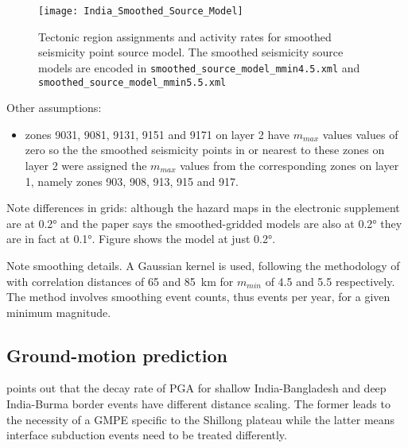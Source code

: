\documentclass{article}
\begin{document}
\begin{figure}[!htb]
\begin{adjustbox}{center}
\texttt{[image: India\_Smoothed\_Source\_Model]}
\end{adjustbox}
\caption[Smoothed seismicity point source model]{Tectonic region assignments and activity rates for smoothed seismicity point source model. The smoothed seismicity source models are encoded in \texttt{smoothed\_source\_model\_mmin4.5.xml} and \texttt{smoothed\_source\_model\_mmin5.5.xml}}
\label{fig:SmoothedSourceModel}
\end{figure}

Other assumptions:
\begin{itemize}
\item zones 9031, 9081, 9131, 9151 and 9171 on layer 2 have $m_{max}$ values values of zero so the the smoothed seismicity points in or nearest to these zones on layer 2 were assigned the $m_{max}$ values from the corresponding zones on layer 1, namely zones 903, 908, 913, 915 and 917.
\end{itemize}

Note differences in grids: although the hazard maps in the electronic supplement are at 0.2° and the paper says the smoothed-gridded models are also at 0.2° they are in fact at 0.1°. Figure shows the model at just 0.2°.

Note smoothing details. A Gaussian kernel is used, following the methodology of \cite{frankel1995mapping} with correlation distances of 65 and 85~km for $m_{min}$ of 4.5 and 5.5 respectively. The method involves smoothing event counts, thus events per year, for a given minimum magnitude.

\subsection{Ground-motion prediction}
\label{sec:GroundMotion}

\cite{sharma2009ground} points out that the decay rate of PGA for shallow India-Bangladesh and deep India-Burma border events have different distance scaling. The former leads to the necessity of a GMPE specific to the Shillong plateau \cite{nath2012ground} while the latter means interface subduction events need to be treated differently. 
\end{document}
